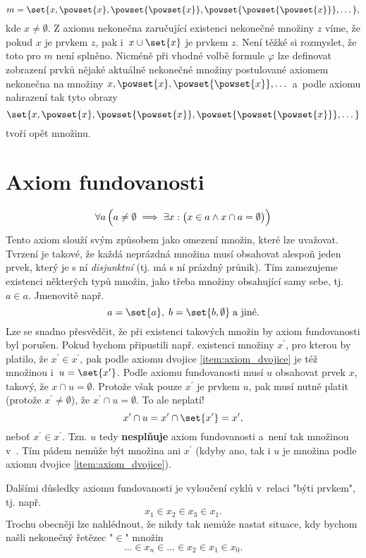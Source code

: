 \begin{equation*}
    m=\set{x,\powset{x},\powset{\powset{x}},\powset{\powset{\powset{x}}},\dots},
\end{equation*}
kde $x\neq\emptyset$. Z axiomu nekonečna zaručující existenci nekonečné množiny $z$ víme, že pokud $x$ je prvkem $z$, pak i~$x\cup\set{x}$ je prvkem $z$. Není těžké si rozmyslet, že toto pro $m$ není splněno. Nicméně při vhodné volbě formule $\varphi$ lze definovat zobrazení prvků nějaké aktuálně nekonečné množiny postulované axiomem nekonečna na množiny $x,\powset{x},\powset{\powset{x}},\dots$ a~podle axiomu nahrazení tak tyto obrazy
\begin{equation*}
    \set{x,\powset{x},\powset{\powset{x}},\powset{\powset{\powset{x}}},\dots}
\end{equation*}
tvoří opět množinu.

\section{Axiom fundovanosti}\label{sec:axiom_fundovanosti}
\begin{equation*}
    \forall a\,\Bigl(a\neq\emptyset \implies \exists x:\bigl(x\in a\land x\cap a=\emptyset\bigr)\Bigr)
\end{equation*}
Tento axiom slouží svým způsobem jako omezení množin, které lze uvažovat. Tvrzení je takové, že každá neprázdná množina musí obsahovat alespoň jeden prvek, který je s ní \emph{disjunktní} (tj. má s ní prázdný průnik). Tím zamezujeme existenci některých typů množin, jako třeba množiny obsahující samy sebe, tj. $a\in a$. Jmenovitě např.
\begin{equation*}
    a=\set{a},\;b=\set{b,\emptyset}\;\text{a jiné.}
\end{equation*}
Lze se snadno přesvědčit, že při existenci takových množin by axiom fundovanosti byl porušen. Pokud bychom připustili např. existenci množiny $x^\prime$, pro kterou by platilo, že $x^\prime\in x^\prime$, pak podle axiomu dvojice \ref{item:axiom_dvojice} je též množinou i~$u=\set{x^\prime}$. Podle axiomu fundovanosti musí $u$ obsahovat prvek $x$, takový, že $x\cap u=\emptyset$. Protože však pouze $x^\prime$ je prvkem $u$, pak musí nutně platit (protože $x^\prime\neq\emptyset$), že $x^\prime\cap u=\emptyset$. To ale neplatí!
\begin{equation*}
    x^\prime\cap u=x^\prime\cap\set{x^\prime}=x^\prime,
\end{equation*}
neboť $x^\prime\in x^\prime$. Tzn. $u$ tedy \textbf{nesplňuje} axiom fundovanosti a~není tak množinou v~\ZF{}. Tím pádem nemůže být množina ani $x^\prime$ (kdyby ano, tak i $u$ je množina podle axiomu dvojice \ref{item:axiom_dvojice}).\par
Dalšími důsledky axiomu fundovanosti je vyloučení cyklů v~relaci "býti prvkem", tj. např.
\begin{equation*}
    x_1\in x_2\in x_3\in x_1.
\end{equation*}
Trochu obecněji lze nahlédnout, že nikdy tak nemůže nastat situace, kdy bychom našli nekonečný řetězec "$\in$" množin
\begin{equation*}
    \dots \in x_n\in \dots\in x_2\in x_1\in x_0.
\end{equation*}
\medskip

